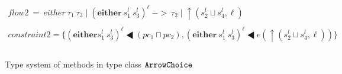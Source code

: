 \documentclass[a4paper]{report}
\newcommand{\co}[1]{$\cod{#1}$}
\newcommand{\sts}[1]{s_{#1}^l}
\newcommand{\sleql}{\LHD}
\newcommand{\tagup}{\uparrow}
\newcommand{\typn}[1]{\tau_{#1}}
\newcommand{\res}[2]{{#1}\mid {#2}}
\begin{document}
\begin{figure}[t]
\[\begin{array}{c}
    flow2~=~\res{either\ \typn{1}\ \typn{3}}{(\mathbf{either}\ \sts{1}\ \sts{3})^\ell}~->~
            \res{\typn{2}}{\tagup (\sts{2}\sqcup \sts{4},\ell)} \\ \\

    constraint2 = \{(\mathbf{either} \sts{1}\ \sts{3})^\ell\sleql (pc_1\sqcap pc_2),
                   (\mathbf{either}\ \sts{1}\ \sts{3})^\ell\sleql e(\tagup (\sts{2}\sqcup \sts{4},\ell)) \} \\ \\
%
    \end{array}
  \]
\caption{Type system of methods in type class \co{ArrowChoice}}
\label{fig:flowarrowref:typesystem1}
\end{figure}
\end{document}
